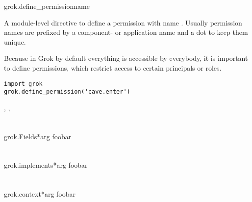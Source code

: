         \begin{funcdesc}{grok.define_permission}{name}

          A module-level directive to define a permission with name
          . Usually permission names are prefixed by a
          component- or application name and a dot to keep them
          unique.

          Because in Grok by default everything is accessible by
          everybody, it is important to define permissions, which
          restrict access to certain principals or roles.


          \begin{verbatim}
import grok
grok.define_permission('cave.enter')
          \end{verbatim}

          \begin{seealso}
            , ,
          \end{seealso}

          
        \end{funcdesc}



    \section{}

        \begin{funcdesc}{grok.Fields}{*arg}
        foobar
        \end{funcdesc}

    \section{}

        \begin{funcdesc}{grok.implements}{*arg}
        foobar
        \end{funcdesc}

    \section{}

        \begin{funcdesc}{grok.context}{*arg}
        foobar
        \end{funcdesc}


